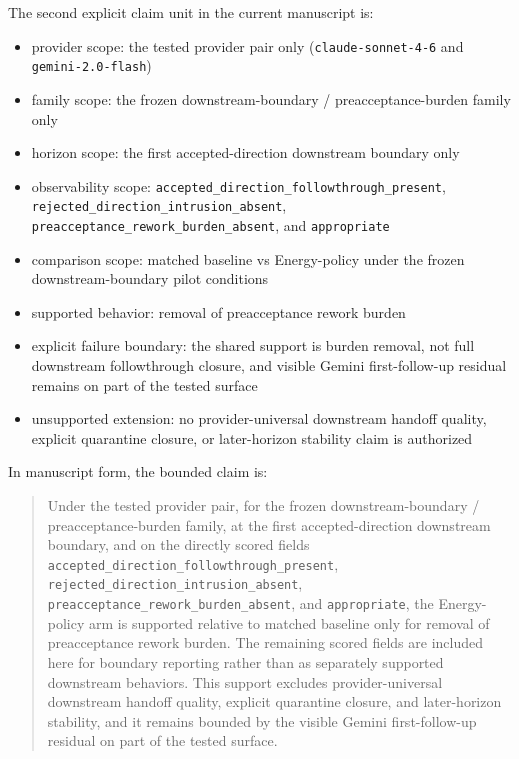 \documentclass[11pt]{article}
\begin{document}
The second explicit claim unit in the current manuscript is:

\begin{itemize}
\item provider scope:
  the tested provider pair only (\texttt{claude-sonnet-4-6} and
  \texttt{gemini-2.0-flash})
\item family scope:
  the frozen downstream-boundary / preacceptance-burden family only
\item horizon scope:
  the first accepted-direction downstream boundary only
\item observability scope:
  \texttt{accepted\_direction\_followthrough\_present},
  \texttt{rejected\_direction\_intrusion\_absent},
  \texttt{preacceptance\_rework\_burden\_absent}, and \texttt{appropriate}
\item comparison scope:
  matched baseline vs Energy-policy under the frozen downstream-boundary pilot
  conditions
\item supported behavior:
  removal of preacceptance rework burden
\item explicit failure boundary:
  the shared support is burden removal, not full downstream followthrough
  closure, and visible Gemini first-follow-up residual remains on part of the
  tested surface
\item unsupported extension:
  no provider-universal downstream handoff quality, explicit quarantine
  closure, or later-horizon stability claim is authorized
\end{itemize}

In manuscript form, the bounded claim is:

\begin{quote}
Under the tested provider pair, for the frozen downstream-boundary /
preacceptance-burden family, at the first accepted-direction downstream
boundary, and on the directly scored fields
\texttt{accepted\_direction\_followthrough\_present},
\texttt{rejected\_direction\_intrusion\_absent},
\texttt{preacceptance\_rework\_burden\_absent}, and \texttt{appropriate}, the
Energy-policy arm is supported relative to matched baseline only for removal of
preacceptance rework burden. The remaining scored fields are included here for
boundary reporting rather than as separately supported downstream behaviors.
This support excludes provider-universal downstream handoff quality, explicit
quarantine closure, and later-horizon stability, and it remains bounded by the
visible Gemini first-follow-up residual on part of the tested surface.
\end{quote}
\end{document}
